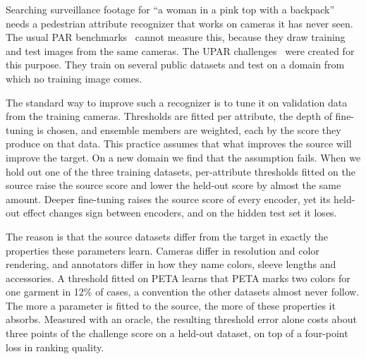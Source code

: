 \documentclass[10pt,twocolumn,letterpaper]{article}
\begin{document}
Searching surveillance footage for ``a woman in a pink top with a backpack'' needs a pedestrian attribute recognizer that works on cameras it has never seen. The usual PAR benchmarks~\cite{peta,pa100k,market} cannot measure this, because they draw training and test images from the same cameras. The UPAR challenges~\cite{upar,upar23,upar24} were created for this purpose. They train on several public datasets and test on a domain from which no training image comes.

The standard way to improve such a recognizer is to tune it on validation data from the training cameras. Thresholds are fitted per attribute, the depth of fine-tuning is chosen, and ensemble members are weighted, each by the score they produce on that data. This practice assumes that what improves the source will improve the target. On a new domain we find that the assumption fails. When we hold out one of the three training datasets, per-attribute thresholds fitted on the source raise the source score and lower the held-out score by almost the same amount. Deeper fine-tuning raises the source score of every encoder, yet its held-out effect changes sign between encoders, and on the hidden test set it loses.

The reason is that the source datasets differ from the target in exactly the properties these parameters learn. Cameras differ in resolution and color rendering, and annotators differ in how they name colors, sleeve lengths and accessories. A threshold fitted on PETA learns that PETA marks two colors for one garment in 12\% of cases, a convention the other datasets almost never follow. The more a parameter is fitted to the source, the more of these properties it absorbs. Measured with an oracle, the resulting threshold error alone costs about three points of the challenge score on a held-out dataset, on top of a four-point loss in ranking quality.
\end{document}

